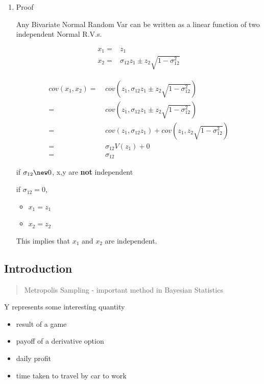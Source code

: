 \documentclass[11pt]{article}
\begin{document}
\begin{enumerate}
\item Proof
\label{sec:orge58e342}

Any Bivariate Normal Random Var can be written as a linear function of two
independent Normal R.V.s.

\begin{equation}
\begin{split}
x_1 = & z_1\\
x_2 = & \sigma_{12} z_1 \pm z_2 \sqrt{1 - \sigma_{12}^2}
\end{split}
\end{equation}


\begin{equation}
\begin{split}
cov(x_1, x_2) = \ & cov(z_1, \sigma_{12} z_1 \pm z_2 \sqrt{1 - \sigma_{12}^2})\\
= \ & cov(z_1, \sigma_{12} z_1 \pm z_2 \sqrt{1 - \sigma_{12}^2})\\
= \ & cov(z_1, \sigma_{12} z_1) + cov(z_1, z_2 \sqrt{1 - \sigma_{12}^2})\\
= \ & \sigma_{12} V(z_1) + 0\\
= \ & \sigma_{12}
\end{split}
\end{equation}

if \(\sigma_{12} \new 0\), x,y are \textbf{not} independent

if \(\sigma_{12} = 0\),
\begin{itemize}
\item \(x_1 = z_1\)
\item \(x_2 = z_2\)
\end{itemize}

This implies that \(x_1\) and \(x_2\) are independent.
\end{enumerate}

\subsection{Introduction}
\label{sec:orgce8814d}

\begin{quote}
Metropolis Sampling - important method in Bayesian Statistics
\end{quote}

Y represents some interesting quantity
\begin{itemize}
\item result of a game
\item payoff of a derivative option
\item daily profit
\item time taken to travel by car to work
\end{itemize}
\end{document}
